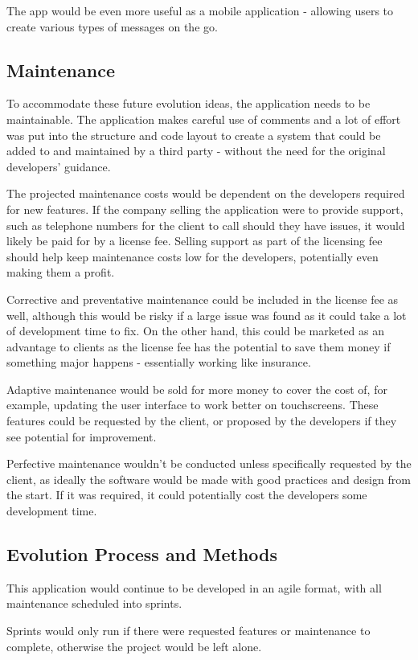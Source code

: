 \documentclass[a4paper]{article}
\begin{document}
The app would be even more useful as a mobile application - allowing users to create various types of messages on the go.

\subsection{Maintenance}
To accommodate these future evolution ideas, the application needs to be maintainable. The application makes careful use of comments and a lot of effort was put into the structure and code layout to create a system that could be added to and maintained by a third party - without the need for the original developers' guidance.

The projected maintenance costs would be dependent on the developers required for new features. If the company selling the application were to provide support, such as telephone numbers for the client to call should they have issues, it would likely be paid for by a license fee. Selling support as part of the licensing fee should help keep maintenance costs low for the developers, potentially even making them a profit.

Corrective and preventative maintenance \cite{typesOfMaintenance} could be included in the license fee as well, although this would be risky if a large issue was found as it could take a lot of development time to fix. On the other hand, this could be marketed as an advantage to clients as the license fee has the potential to save them money if something major happens - essentially working like insurance.

Adaptive maintenance would be sold for more money to cover the cost of, for example, updating the user interface to work better on touchscreens. These features could be requested by the client, or proposed by the developers if they see potential for improvement.

Perfective maintenance wouldn't be conducted unless specifically requested by the client, as ideally the software would be made with good practices and design from the start. If it was required, it could potentially cost the developers some development time.

\subsection{Evolution Process and Methods}
This application would continue to be developed in an agile format, with all maintenance scheduled into sprints.

Sprints would only run if there were requested features or maintenance to complete, otherwise the project would be left alone.
\end{document}
